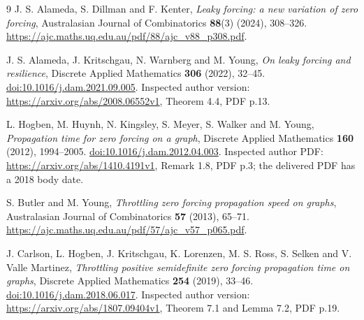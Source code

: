 \documentclass[11pt,a4paper]{article}
\begin{document}
\begin{thebibliography}{9}
J. S. Alameda, S. Dillman and F. Kenter,
\emph{Leaky forcing: a new variation of zero forcing},
Australasian Journal of Combinatorics \textbf{88}(3) (2024), 308--326.
\url{https://ajc.maths.uq.edu.au/pdf/88/ajc_v88_p308.pdf}.

J. S. Alameda, J. Kritschgau, N. Warnberg and M. Young,
\emph{On leaky forcing and resilience},
Discrete Applied Mathematics \textbf{306} (2022), 32--45.
\href{https://doi.org/10.1016/j.dam.2021.09.005}{doi:10.1016/j.dam.2021.09.005}.
Inspected author version: \url{https://arxiv.org/abs/2008.06552v1},
Theorem 4.4, PDF p.13.

L. Hogben, M. Huynh, N. Kingsley, S. Meyer, S. Walker and M. Young,
\emph{Propagation time for zero forcing on a graph},
Discrete Applied Mathematics \textbf{160} (2012), 1994--2005.
\href{https://doi.org/10.1016/j.dam.2012.04.003}{doi:10.1016/j.dam.2012.04.003}.
Inspected author PDF: \url{https://arxiv.org/abs/1410.4191v1},
Remark 1.8, PDF p.3; the delivered PDF has a 2018 body date.

S. Butler and M. Young,
\emph{Throttling zero forcing propagation speed on graphs},
Australasian Journal of Combinatorics \textbf{57} (2013), 65--71.
\url{https://ajc.maths.uq.edu.au/pdf/57/ajc_v57_p065.pdf}.

J. Carlson, L. Hogben, J. Kritschgau, K. Lorenzen, M. S. Ross,
S. Selken and V. Valle Martinez,
\emph{Throttling positive semidefinite zero forcing propagation time on graphs},
Discrete Applied Mathematics \textbf{254} (2019), 33--46.
\href{https://doi.org/10.1016/j.dam.2018.06.017}{doi:10.1016/j.dam.2018.06.017}.
Inspected author version: \url{https://arxiv.org/abs/1807.09404v1},
Theorem 7.1 and Lemma 7.2, PDF p.19.
\end{thebibliography}
\end{document}
